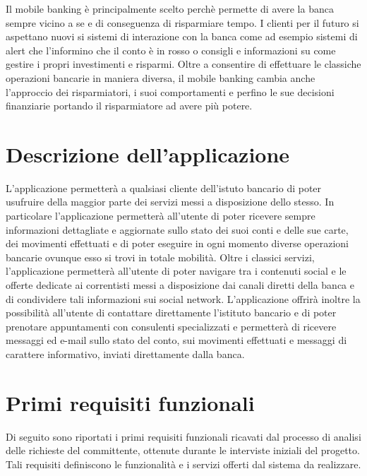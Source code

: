 Il mobile banking è principalmente scelto perchè permette di avere la banca sempre vicino a se e di conseguenza  di risparmiare tempo. I clienti per il futuro si aspettano nuovi si sistemi di interazione con la banca come ad esempio sistemi di alert che l’informino che il conto è in rosso o consigli e informazioni su come gestire i propri investimenti e risparmi.
Oltre a consentire di effettuare le classiche operazioni bancarie in maniera diversa, il mobile banking cambia anche l’approccio dei  risparmiatori, i suoi comportamenti e perfino le sue decisioni finanziarie portando il risparmiatore ad avere più potere.

\section{Descrizione dell'applicazione}

L'applicazione permetterà a qualsiasi cliente dell'istuto bancario di poter usufruire della maggior parte dei servizi messi a disposizione dello stesso. In particolare l'applicazione permetterà all'utente di poter ricevere sempre informazioni dettagliate e aggiornate sullo stato dei suoi conti e delle sue carte, dei movimenti effettuati e di poter eseguire in ogni momento diverse operazioni bancarie ovunque esso si trovi in totale mobilità. Oltre i classici servizi, l'applicazione permetterà all'utente di poter navigare tra i contenuti social e le offerte dedicate ai correntisti messi a disposizione dai canali diretti della banca e di condividere tali informazioni sui social network.
L'applicazione offrirà inoltre la possibilità all'utente di contattare direttamente l'istituto bancario e di poter prenotare appuntamenti con consulenti specializzati e permetterà di ricevere messaggi ed e-mail sullo stato del conto, sui movimenti effettuati e messaggi di carattere informativo, inviati direttamente dalla banca.


\section{Primi requisiti funzionali}
Di seguito sono riportati i primi requisiti funzionali ricavati dal processo di analisi delle richieste del committente, ottenute durante le interviste iniziali del progetto. Tali requisiti definiscono le funzionalità e i servizi 
offerti dal sistema da realizzare.

